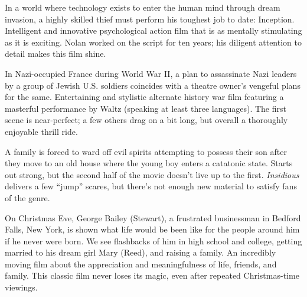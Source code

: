    In a world where technology exists to enter the human mind through dream invasion, a highly skilled thief must perform his toughest job to date: Inception. Intelligent and innovative psychological action film that is as mentally stimulating as it is exciting. Nolan worked on the script for ten years; his diligent attention to detail makes this film shine. \author{DW} 

   In Nazi-occupied France during World War II, a plan to assassinate Nazi leaders by a group of Jewish U.S. soldiers coincides with a theatre owner's vengeful plans for the same. Entertaining and stylistic alternate history war film featuring a masterful performance by Waltz (speaking at least three languages). The first scene is near-perfect; a few others drag on a bit long, but overall a thoroughly enjoyable thrill ride. \author{DW} 

   A family is forced to ward off evil spirits attempting to possess their son after they move to an old house where the young boy enters a catatonic state. Starts out strong, but the second half of the movie doesn't live up to the first. \textit{Insidious} delivers a few ``jump'' scares, but there's not enough new material to satisfy fans of the genre. \author{DW} 

   On Christmas Eve, George Bailey (Stewart), a frustrated businessman in Bedford Falls, New York, is shown what life would be been like for the people around him if he never were born. We see flashbacks of him in high school and college, getting married to his dream girl Mary (Reed), and raising a family. An incredibly moving film about the appreciation and meaningfulness of life, friends, and family. This classic film never loses its magic, even after repeated Christmas-time viewings. \author{AW} 
